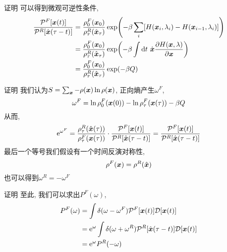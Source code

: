     \begin{frame}{证明}
        可以得到微观可逆性条件,
        \begin{equation}
            \begin{split}
                \frac{\mathcal{P}^F[\vb*x(t)]}{\mathcal{P}^R[\hat{\vb*x}(\tau-t)]} &= \frac{\rho^F_0(\vb*x_0)}{\rho^R_\tau(\hat{\vb*x}_\tau)}\exp(-\beta\sum_i [H(\vb*x_i,\lambda_i) - H(\vb*x_{i-1},\lambda_i)]) \\
                &= \frac{\rho^F_0(\vb*x_0)}{\rho^R_\tau(\hat{\vb*x}_\tau)}\exp(-\beta\int\dd t\ \dot{\vb*x}\pdv{H(\vb*x,\lambda)}{\vb*x})\\
                &= \frac{\rho^F_0(\vb*x_0)}{\rho^R_\tau(\hat{\vb*x}_\tau)}\exp(-\beta Q)
            \end{split}
        \end{equation}
    \end{frame}
    \begin{frame}{证明}
        我们认为$S = \sum_{\vb*x} - \rho(\vb*x)\ln\rho(\vb*x)$, 
        正向熵产生$\omega^F$, 
        \begin{equation}
            \omega^F = \ln\rho^F_0(\vb*x(0)) - \ln\rho^F_\tau(\vb*x(\tau)) - \beta Q
        \end{equation}
        从而,
        \begin{equation}
            \mathrm{e}^{\omega^F} = \frac{\rho^R_\tau(\hat{\vb*x}(\tau))}{\rho^F_\tau(\vb*x(\tau))}\cdot\frac{\mathcal{P}^F[\vb*x(t)]}{\mathcal{P}^R[\hat{\vb*x}(\tau-t)]} = \frac{\mathcal{P}^F[\vb*x(t)]}{\mathcal{P}^R[\hat{\vb*x}(\tau-t)]}
        \end{equation}
        最后一个等号我们假设有一个时间反演对称性,
        \begin{equation}
            \rho^F(\vb*x) = \rho^R(\hat{\vb*x})
        \end{equation}
        也可以得到$\omega^R = -\omega^F$
    \end{frame}
    \begin{frame}{证明}
        至此, 我们可以求出$P^F(\omega)$,
        \begin{equation}
            \begin{split}
                P^F(\omega) &= \int\delta(\omega-\omega^F) \mathcal P^F[\vb*x(t)]\mathcal D[\vb*x(t)]\\
                &= \mathrm{e}^{\omega}\int\delta(\omega+\omega^R)\mathcal{P}^R[\hat{\vb*x}(\tau-t)]\mathcal D[\vb*x(t)]\\
                &= \mathrm{e}^{\omega}P^R(-\omega)
            \end{split}
        \end{equation}
    \end{frame}
